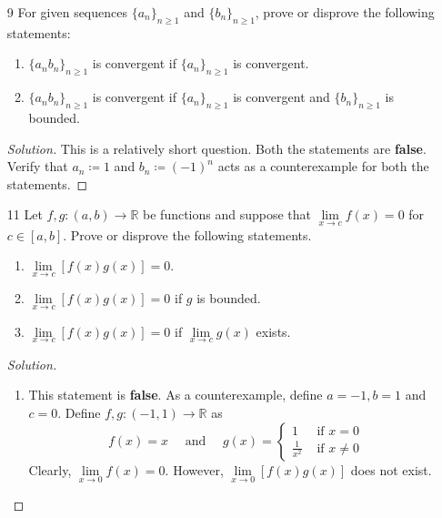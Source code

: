 \documentclass[12pt]{article}
\theoremstyle{definition}
\newenvironment{soln}{\begin{proof}[Solution]}{\end{proof}}
\begin{document}
\begin{enumerate}[leftmargin=*]
    \item[9] For given sequences $\{a_n\}_{n \geq 1}$ and $\{b_n\}_{n \geq 1}$, prove or disprove the following statements:
    \begin{enumerate}[label = (\roman*)]
        \item $\{a_n b_n\}_{n \geq 1}$ is convergent if $\{a_n\}_{n \geq 1}$ is convergent.
        \item $\{a_n b_n \}_{n \geq 1}$ is convergent if $\{a_n\}_{n \geq 1}$ is convergent and $\{b_n\}_{n \geq 1}$ is bounded.
    \end{enumerate}
    
    \begin{soln}
        This is a relatively short question. Both the statements are \textbf{false}. Verify that $a_n \coloneqq 1$ and $b_n \coloneqq (-1)^n$ acts as a counterexample for both the statements.
    \end{soln}
    
    \newpage
    
    \item[11] Let $f,g \colon (a,b) \rightarrow \mathbb{R}$ be functions and suppose that $\lim\limits_{x \to c} f(x) = 0$ for $c \in [a,b]$. Prove or disprove the following statements. 
    \begin{enumerate}[label = (\roman*)]
        \item $\lim\limits_{x \to c} \left[ f(x) g(x) \right] = 0$.
        \item $\lim\limits_{x \to c} \left[ f(x) g(x) \right] = 0$ if $g$ is bounded.
        \item $\lim\limits_{x \to c} \left[ f(x) g(x) \right] = 0$ if $\lim\limits_{x \to c} g(x)$ exists.
    \end{enumerate}
    \begin{soln}
    
        \begin{enumerate}[label = (\roman*), labelwidth=!, labelindent=0pt]
            \item This statement is \textbf{false}. As a counterexample, define $a=-1, b=1$ and $c=0$. Define $f,g \colon (-1,1) \rightarrow \mathbb{R}$ as
            \[
                f(x) = x \quad \text{ and } \quad g(x) = \begin{cases}
                    1 & \text{ if } x=0 \\
                    \frac{1}{x^2} & \text{ if } x \neq 0
                \end{cases}
            \]
            Clearly, $\lim\limits_{x \to 0} f(x) = 0$. However, $\lim\limits_{x \to 0} \left[ f(x) g(x) \right]$ does not exist.
            

\end{enumerate}
\end{soln}
\end{enumerate}
\end{document}
